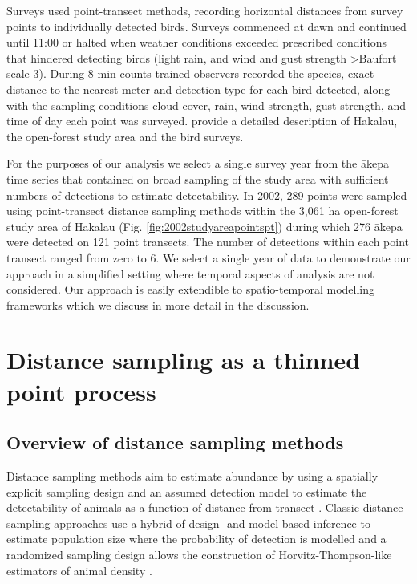 \documentclass[preprint,12pt]{elsarticle}
\newcommand{\akepa}{\textquotesingle\={a}kepa}  %
\begin{document}
Surveys used point-transect methods, recording horizontal distances from survey points to individually detected birds. Surveys commenced at dawn and continued until 11:00 or halted when weather conditions exceeded prescribed conditions that hindered detecting birds (light rain, and wind and gust strength \textgreater Baufort scale 3). During 8-min counts trained observers recorded the species, exact distance to the nearest meter and detection type for each bird detected, along with the sampling conditions cloud cover, rain, wind strength, gust strength, and time of day each point was surveyed.   \cite{camp_population_2010,camp_statespace_2016} provide a detailed description of Hakalau, the open-forest study area and the bird surveys.

For the purposes of our analysis we select a single survey year from the \akepa{} time series that contained on broad sampling of the study area with sufficient numbers of detections to estimate detectability. In 2002, 289 points were sampled using point-transect distance sampling methods within the 3,061 ha open-forest study area of Hakalau (Fig. \ref{fig:2002studyareapointspt}) during which 276 \akepa{} were detected on 121 point transects. The number of detections within each point transect ranged from zero to 6. We select a single year of data to demonstrate our approach in a simplified setting where temporal aspects of analysis are not considered.  Our approach is easily extendible to spatio-temporal modelling frameworks which we discuss in more detail in the discussion.

\section{Distance sampling as a thinned point process}

\subsection{Overview of distance sampling methods}

Distance sampling methods aim to estimate abundance by using a spatially explicit sampling design and an assumed detection model to estimate the detectability of animals as a function of distance from transect \citep{buckland_advanced_2004, buckland_distance_2015}.  Classic distance sampling approaches use a hybrid of design- and model-based inference to estimate population size where the probability of detection is modelled and a randomized sampling design allows the construction of Horvitz-Thompson-like estimators of animal density \citep{horvitz_generalization_1952,  buckland_advanced_2004}.
\end{document}
